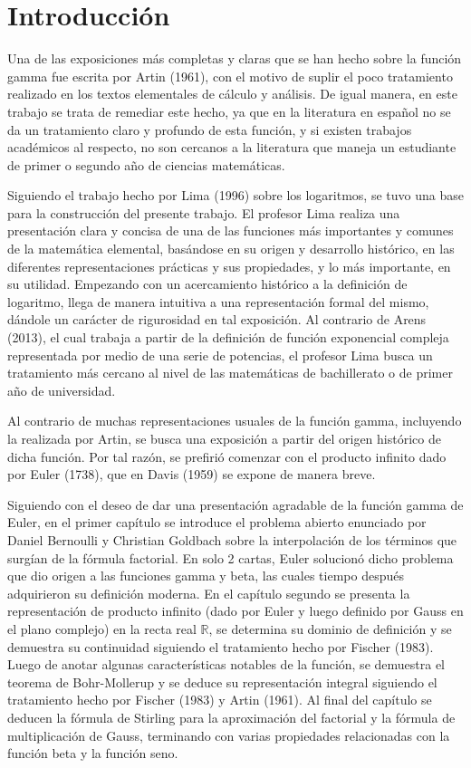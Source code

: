 \chapter*{Introducción}

Una de las exposiciones más completas y claras que se han hecho sobre la función gamma fue escrita por Artin (1961), con el motivo de suplir el poco tratamiento realizado en los textos elementales de cálculo y análisis. De igual manera, en este trabajo se trata de remediar este hecho, ya que en la literatura en español no se da un tratamiento claro y profundo de esta función, y si existen trabajos académicos al respecto, no son cercanos a la literatura que maneja un estudiante de primer o segundo año de ciencias matemáticas. 

Siguiendo el trabajo hecho por Lima (1996) sobre los logaritmos, se tuvo una base para la construcción del presente trabajo. El profesor Lima realiza una presentación clara y concisa de una de las funciones más importantes y comunes de la matemática elemental, basándose en su origen y desarrollo histórico, en las diferentes representaciones prácticas y sus propiedades, y lo más importante, en su utilidad. Empezando con un acercamiento histórico a la definición de logaritmo, llega de manera intuitiva a una representación formal del mismo, dándole un carácter de rigurosidad en tal exposición. Al contrario de Arens (2013), el cual trabaja a partir de la definición de función exponencial compleja representada por medio de una serie de potencias, el profesor Lima busca un tratamiento más cercano al nivel de las matemáticas de bachillerato o de primer año de universidad.

Al contrario de muchas representaciones usuales de la función gamma, incluyendo la realizada por Artin, se busca una exposición a partir del origen histórico de dicha función. Por tal razón, se prefirió comenzar con el producto infinito dado por Euler (1738), que en Davis (1959) se expone de manera breve. 

Siguiendo con el deseo de dar una presentación agradable de la función gamma de Euler, en el primer capítulo se introduce el problema abierto enunciado por Daniel Bernoulli y Christian Goldbach sobre la interpolación de los términos que surgían de la fórmula factorial. En solo 2 cartas, Euler solucionó dicho problema que dio origen a las funciones gamma y beta, las cuales tiempo después adquirieron su definición moderna. En el capítulo segundo se presenta la representación de producto infinito (dado por Euler y luego definido por Gauss en el plano complejo) en la recta real $\mathbb{R}$, se determina su dominio de definición y se demuestra su continuidad siguiendo el tratamiento hecho por Fischer (1983). Luego de anotar algunas características notables de la función, se demuestra el teorema de Bohr-Mollerup y se deduce su representación integral siguiendo el tratamiento hecho por Fischer (1983) y Artin (1961). Al final del capítulo se deducen la fórmula de Stirling para la aproximación del factorial y la fórmula de multiplicación de Gauss, terminando con varias propiedades relacionadas con la función beta y la función seno.

